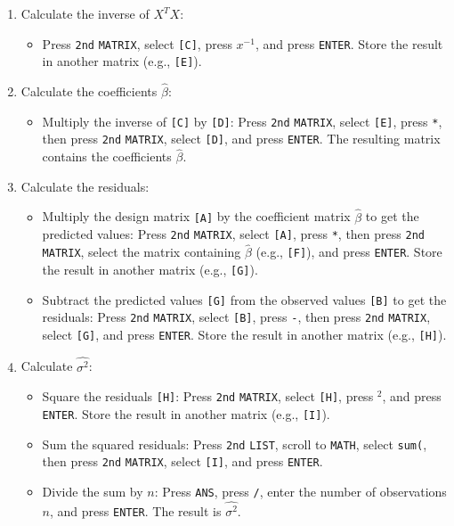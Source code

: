 \documentclass{article}
\newcommand{\code}[1]{\colorbox{light-gray}{\texttt{#1}}}
\begin{document}
\begin{enumerate}
\begin{itemize}
    \end{itemize}
    \item Calculate the inverse of $X^T X$:
    \begin{itemize}
        \item Press \code{2nd} \code{MATRIX}, select \code{[C]}, press \code{$x^{-1}$}, and press \code{ENTER}. Store the result in another matrix (e.g., \code{[E]}).
    \end{itemize}
    \item Calculate the coefficients $\hat{\beta}$:
    \begin{itemize}
        \item Multiply the inverse of \code{[C]} by \code{[D]}: Press \code{2nd} \code{MATRIX}, select \code{[E]}, press \code{*}, then press \code{2nd} \code{MATRIX}, select \code{[D]}, and press \code{ENTER}. The resulting matrix contains the coefficients $\hat{\beta}$.
    \end{itemize}
    \item Calculate the residuals:
    \begin{itemize}
        \item Multiply the design matrix \code{[A]} by the coefficient matrix $\hat{\beta}$ to get the predicted values: Press \code{2nd} \code{MATRIX}, select \code{[A]}, press \code{*}, then press \code{2nd} \code{MATRIX}, select the matrix containing $\hat{\beta}$ (e.g., \code{[F]}), and press \code{ENTER}. Store the result in another matrix (e.g., \code{[G]}).
        \item Subtract the predicted values \code{[G]} from the observed values \code{[B]} to get the residuals: Press \code{2nd} \code{MATRIX}, select \code{[B]}, press \code{-}, then press \code{2nd} \code{MATRIX}, select \code{[G]}, and press \code{ENTER}. Store the result in another matrix (e.g., \code{[H]}).
    \end{itemize}
    \item Calculate $\hat{\sigma^2}$:
    \begin{itemize}
        \item Square the residuals \code{[H]}: Press \code{2nd} \code{MATRIX}, select \code{[H]}, press \code{$^2$}, and press \code{ENTER}. Store the result in another matrix (e.g., \code{[I]}).
        \item Sum the squared residuals: Press \code{2nd} \code{LIST}, scroll to \code{MATH}, select \code{sum(}, then press \code{2nd} \code{MATRIX}, select \code{[I]}, and press \code{ENTER}.
        \item Divide the sum by $n$: Press \code{ANS}, press \code{/}, enter the number of observations $n$, and press \code{ENTER}. The result is $\hat{\sigma^2}$.
    \end{itemize}
\end{enumerate}
\end{document}
